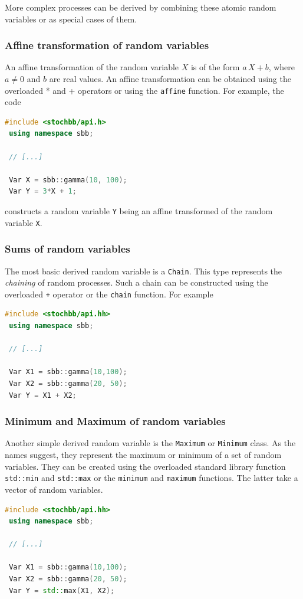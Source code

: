 \documentclass[a4paper, 10pt]{paper}
\newcommand{\code}[1]{\texttt{#1}}
\newcommand{\class}[1]{\code{#1}}
\newcommand{\function}[1]{\code{#1}}
\begin{document}
More complex processes can be derived by combining these atomic random variables or as special cases of them.

\subsubsection{Affine transformation of random variables}
An affine transformation of the random variable $X$ is of the form $a\,X+b$, where $a\neq 0$ and $b$ are
real values. An affine transformation can be obtained using the overloaded * and + operators or using the
\function{affine} function. For example, the code
\begin{lstlisting}[language=C++]
 #include <stochbb/api.h>
 using namespace sbb;
 
 // [...]
 
 Var X = sbb::gamma(10, 100);
 Var Y = 3*X + 1;
\end{lstlisting}
constructs a random variable \code{Y} being an affine transformed of the random variable \code{X}.

\subsubsection{Sums of random variables}
The most basic derived random variable is a \class{Chain}. This type represents the \emph{chaining} of
random processes. Such a chain can be constructed using the overloaded \code{+} operator
or the \function{chain} function. For example
\begin{lstlisting}[language=C++]
 #include <stochbb/api.hh>
 using namespace sbb;

 // [...]

 Var X1 = sbb::gamma(10,100);
 Var X2 = sbb::gamma(20, 50);
 Var Y = X1 + X2;
\end{lstlisting}

\subsubsection{Minimum and Maximum of random variables}
Another simple derived random variable is the \class{Maximum} or \class{Minimum} class. As the
names suggest, they represent the maximum or minimum of a set of random variables. They can be
created using the overloaded standard library function \function{std::min} and \function{std::max} or the
\function{minimum} and \function{maximum} functions. The latter take a vector of random variables.
\begin{lstlisting}[language=C++]
 #include <stochbb/api.hh>
 using namespace sbb;

 // [...]

 Var X1 = sbb::gamma(10,100);
 Var X2 = sbb::gamma(20, 50);
 Var Y = std::max(X1, X2);
\end{lstlisting}
\end{document}
